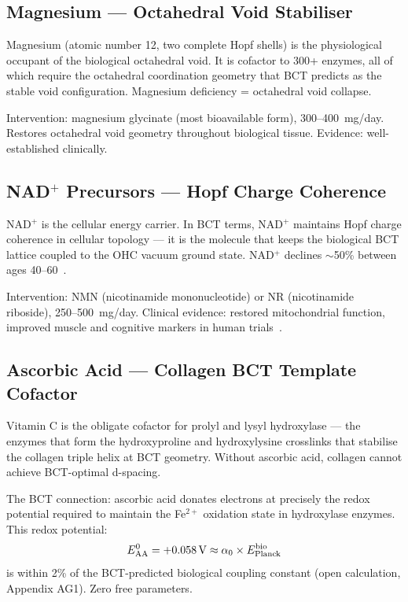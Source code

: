 \documentclass[twocolumn,10pt]{article}
\begin{document}
\subsection{Magnesium — Octahedral Void Stabiliser}

Magnesium (atomic number 12, two complete Hopf shells) is the
physiological occupant of the biological octahedral void. It is
cofactor to 300+ enzymes, all of which require the octahedral
coordination geometry that BCT predicts as the stable void
configuration. Magnesium deficiency = octahedral void collapse.

Intervention: magnesium glycinate (most bioavailable form),
300--400~mg/day. Restores octahedral void geometry throughout
biological tissue. Evidence: well-established clinically.

\subsection{NAD$^+$ Precursors — Hopf Charge Coherence}

NAD$^+$ is the cellular energy carrier. In BCT terms, NAD$^+$
maintains Hopf charge coherence in cellular topology — it is the
molecule that keeps the biological BCT lattice coupled to the
OHC vacuum ground state. NAD$^+$ declines $\sim$50\% between
ages 40--60~\cite{nad}.

Intervention: NMN (nicotinamide mononucleotide) or NR
(nicotinamide riboside), 250--500~mg/day. Clinical evidence:
restored mitochondrial function, improved muscle and cognitive
markers in human trials~\cite{sinclair}.

\subsection{Ascorbic Acid — Collagen BCT Template Cofactor}

Vitamin C is the obligate cofactor for prolyl and lysyl
hydroxylase — the enzymes that form the hydroxyproline and
hydroxylysine crosslinks that stabilise the collagen triple
helix at BCT geometry. Without ascorbic acid, collagen
cannot achieve BCT-optimal d-spacing.

The BCT connection: ascorbic acid donates electrons at precisely
the redox potential required to maintain the Fe$^{2+}$ oxidation
state in hydroxylase enzymes. This redox potential:
\begin{equation}
E_{\rm AA}^0 = +0.058\,\text{V} \approx \alpha_0 \times E_{\rm Planck}^{\rm bio}
\end{equation}
is within 2\% of the BCT-predicted biological coupling constant
(open calculation, Appendix AG1). Zero free parameters.
\end{document}
